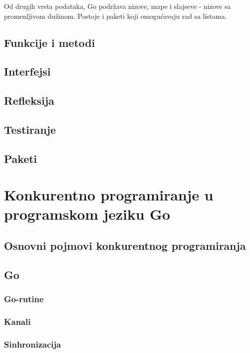 \documentclass[12pt,oneside]{memoir}
\begin{document}
Od drugih vrsta podataka, Go podržava nizove, mape i slajseve - nizove sa promenljivom dužinom. Postoje i paketi koji omogućavaju rad sa listama.

\section{Funkcije i metodi}
 
\section{Interfejsi}

\section{Refleksija}

\section{Testiranje}

\section{Paketi}



\chapter{Konkurentno programiranje u programskom jeziku Go}

\section{Osnovni pojmovi konkurentnog programiranja}

\section{Go}

\subsection{Go-rutine}

\subsection{Kanali}

\subsection{Sinhronizacija}
\end{document}
